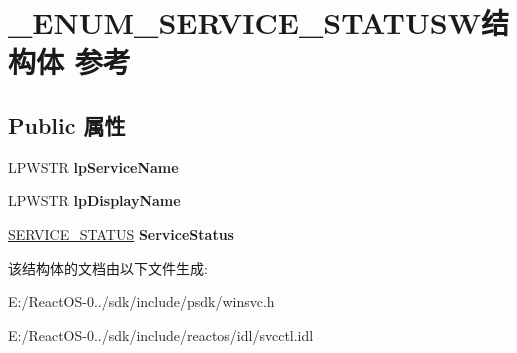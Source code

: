 \hypertarget{struct___e_n_u_m___s_e_r_v_i_c_e___s_t_a_t_u_s_w}{}\section{\+\_\+\+E\+N\+U\+M\+\_\+\+S\+E\+R\+V\+I\+C\+E\+\_\+\+S\+T\+A\+T\+U\+S\+W结构体 参考}
\label{struct___e_n_u_m___s_e_r_v_i_c_e___s_t_a_t_u_s_w}
\subsection*{Public 属性}
\begin{DoxyCompactItemize}
\item 
\mbox{\label{struct___e_n_u_m___s_e_r_v_i_c_e___s_t_a_t_u_s_w_af2c8c7abbdf303d2951bcfcda9d7087f}} 
L\+P\+W\+S\+TR {\bfseries lp\+Service\+Name}
\item 
\mbox{\label{struct___e_n_u_m___s_e_r_v_i_c_e___s_t_a_t_u_s_w_a64a6ef327163270799ef48b7ab8e7b40}} 
L\+P\+W\+S\+TR {\bfseries lp\+Display\+Name}
\item 
\mbox{\label{struct___e_n_u_m___s_e_r_v_i_c_e___s_t_a_t_u_s_w_a4ed5091fd0c2a2ccaa05a2b5674dc86e}} 
\hyperlink{struct___s_e_r_v_i_c_e___s_t_a_t_u_s}{S\+E\+R\+V\+I\+C\+E\+\_\+\+S\+T\+A\+T\+US} {\bfseries Service\+Status}
\end{DoxyCompactItemize}


该结构体的文档由以下文件生成\+:\begin{DoxyCompactItemize}
\item 
E\+:/\+React\+O\+S-\/0../sdk/include/psdk/winsvc.\+h\item 
E\+:/\+React\+O\+S-\/0../sdk/include/reactos/idl/svcctl.\+idl\end{DoxyCompactItemize}

